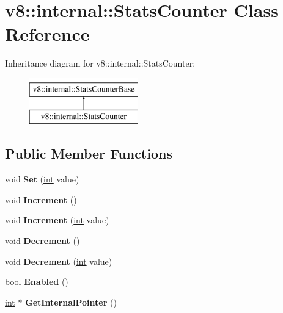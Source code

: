 \hypertarget{classv8_1_1internal_1_1StatsCounter}{}\section{v8\+:\+:internal\+:\+:Stats\+Counter Class Reference}
\label{classv8_1_1internal_1_1StatsCounter}
Inheritance diagram for v8\+:\+:internal\+:\+:Stats\+Counter\+:\begin{figure}[H]
\begin{center}
\leavevmode
\includegraphics[height=2.000000cm]{classv8_1_1internal_1_1StatsCounter}
\end{center}
\end{figure}
\subsection*{Public Member Functions}
\begin{DoxyCompactItemize}
\item 
\mbox{\label{classv8_1_1internal_1_1StatsCounter_aab7d2cc46f664c55ce42c0e76ac1948e}} 
void {\bfseries Set} (\mbox{\hyperlink{classint}{int}} value)
\item 
\mbox{\label{classv8_1_1internal_1_1StatsCounter_a4cdc5bd23db581434e00b11dac816da4}} 
void {\bfseries Increment} ()
\item 
\mbox{\label{classv8_1_1internal_1_1StatsCounter_ae4c0e7e6f3e5a9ca15a8a9a17fc39fb2}} 
void {\bfseries Increment} (\mbox{\hyperlink{classint}{int}} value)
\item 
\mbox{\label{classv8_1_1internal_1_1StatsCounter_aa077f958b0c5d985b577b92b9c7f39fa}} 
void {\bfseries Decrement} ()
\item 
\mbox{\label{classv8_1_1internal_1_1StatsCounter_ad4ec0707eb464394d638340ee2f22996}} 
void {\bfseries Decrement} (\mbox{\hyperlink{classint}{int}} value)
\item 
\mbox{\label{classv8_1_1internal_1_1StatsCounter_abcc22126787bbe92b4dd31979124cf84}} 
\mbox{\hyperlink{classbool}{bool}} {\bfseries Enabled} ()
\item 
\mbox{\label{classv8_1_1internal_1_1StatsCounter_a4f90a518642c3bcdc8e5aff05824c3bb}} 
\mbox{\hyperlink{classint}{int}} $\ast$ {\bfseries Get\+Internal\+Pointer} ()
\end{DoxyCompactItemize}
